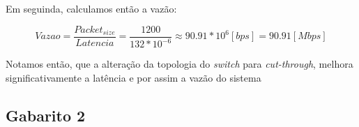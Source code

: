 Em seguinda, calculamos então a vazão:

\begin{equation}
	Vazao = \frac{Packet_{size}}{Latencia} = \frac{1200}{132 * 10^{-6}} \approx 90.91 * 10^6 [bps] = 90.91 [Mbps]
\end{equation}

Notamos então, que a alteração da topologia do \textit{switch} para \textit{cut-through}, melhora significativamente a latência e por assim a vazão do sistema

\subsection{Gabarito 2}